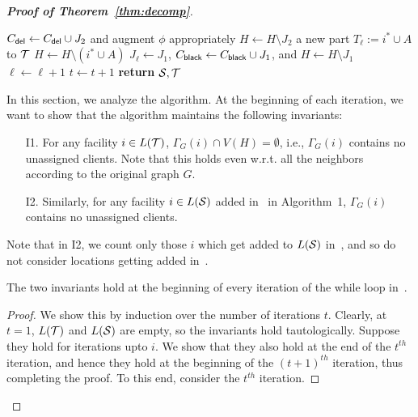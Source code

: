 \begin{proof}[{\bf Proof of Theorem~\ref{thm:decomp}}]
\begin{algorithm}
\begin{algorithmic}[1]
\State $C_{\mathsf{del}} \gets C_{\mathsf{del}} \cup J_2$ and augment $\phi$ appropriately  \label{alg:phi2}
\State $H \gets H \setminus J_2$
 a new part $T_\ell := i^* \cup A$ to ${\cal T}$  \label{alg:case2b}
\State $H \gets H \setminus (i^* \cup A)$ 
\State $J_\ell \gets J_1$, $C_{\mathsf{black}} \gets C_{\mathsf{black}} \cup J_1$, and $H \gets H \setminus J_1$  \label{alg:color2}
\State $\ell \gets \ell + 1$
\EndIf
\State $t \gets t+1 $ 
\EndWhile\label{euclidendwhile}
\State \textbf{return} ${\cal S},{\cal T}$
\EndProcedure
\end{algorithmic}
\end{algorithm}

In this section, we analyze the algorithm.
\medskip \noindent
At the beginning of each iteration, we want to show that the algorithm maintains the following invariants:
\begin{framed}
\begin{enumerate}%
	\item[I1.] For any facility $i\in L({\cal T})$, $\Gamma_G(i) \cap V(H) = \emptyset$, i.e., $\Gamma_G(i)$  contains no unassigned clients. Note that this holds even w.r.t. all the neighbors according to the original graph $G$.
\item[I2.] Similarly, for any facility $i \in L({\cal S})$  added in~ in Algorithm~1, $\Gamma_G(i)$ contains no unassigned clients.
\end{enumerate}
\end{framed}
Note that in I2, we count only those $i$ which get added to $L({\cal S})$ in~, and so do not consider locations getting added in~.

\begin{claim}
\label{cl:inv}
The two invariants hold at the beginning of every iteration of the while loop in~.
\end{claim}
\begin{proof}
We show this by induction over the number of iterations $t$. Clearly, at $t=1$, $L({\cal T})$ and $L({\cal S})$ are empty, so the invariants hold tautologically. Suppose they hold for iterations upto $i$. We show that they also hold at the end of the $t^{th}$ iteration, and hence they hold at the beginning of the $(t+1)^{th}$ iteration, thus completing the proof. To this end, consider the $t^{th}$ iteration.


\end{proof}
\end{proof}
